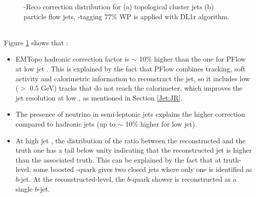 \begin{figure}[htbp]
   \centering
   \quad
   \begin{tcolorbox}[colback=black!5!white,colframe=white!75!black]
   \caption{\pT-Reco correction distribution for (a) topological cluster jets (b) particle flow jets, \bq-tagging 77\% WP is applied with DL1r algorithm.}
   \label{fig:Jet:Cal:BCal:pTReco}
   \end{tcolorbox}
   
\end{figure}
\\
Figure \ref{fig:Jet:Cal:BCal:pTReco} shows that :
\begin{itemize}
    \item EMTopo hadronic correction factor is $\sim$ 10\% higher than the one for PFlow at low jet \pT. This is explained by the fact that PFlow combines tracking, soft activity and calorimetric information to reconstruct the jet, so it includes low \pT (\pT $>$ 0.5 GeV) tracks that do not reach the calorimeter, which improves the jet resolution at low \pT, as mentioned in Section \ref{Jet:JR}. 
    \item The presence of neutrino in semi-leptonic jets explains the higher correction compared to hadronic jets (up to $\sim$ 10\% higher for low \pT jet).
    \item At high jet \pT, the distribution of the ratio between the reconstructed \pT and the truth one has a tail below unity indicating that the reconstructed jet \pT is higher than the associated truth. This can be explained by the fact that at truth-level, some boosted \bq-quark gives two closed jets where only one is identified as $b$-jet. At the reconstructed-level, the $b$-quark shower is reconstructed as a single $b$-jet.
\end{itemize}

